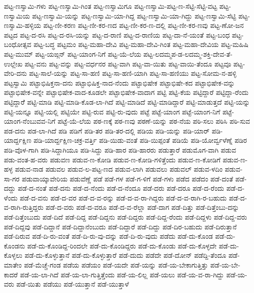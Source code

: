 ಪಟ್ಟ-ಣಸ್ವಾಮಿ-ಗಳು
ಪಟ್ಟ-ಣಸ್ವಾಮಿ-ಗಿಂತ
ಪಟ್ಟ-ಣಸ್ವಾಮಿಗೂ
ಪಟ್ಟ-ಣಸ್ವಾಮಿ-ಪಟ್ಟ-ಣ-ಸೆಟ್ಟಿ-ಸೆಟ್ಟಿ-ವಟ್ಟ
ಪಟ್ಟ-ಣಸ್ವಾಮಿಯ
ಪಟ್ಟ-ಣಸ್ವಾಮಿ-ಯನ್ನು
ಪಟ್ಟ-ಣಸ್ವಾಮಿ-ಯಾ-ಗಿದ್ದ
ಪಟ್ಟ-ಣಸ್ವಾಮಿ-ಯಾ-ಗಿದ್ದು
ಪಟ್ಟ-ಣಸ್ವಾಮಿ-ಸೆಟ್ಟಿ
ಪಟ್ಟ-ಣಸ್ವಾಮಿ-ಹಳ್ಳಿಯ
ಪಟ್ಟ-ಣೀ-ಕರಣ
ಪಟ್ಟ-ಣೀ-ಕರ-ಣದ
ಪಟ್ಟ-ಣೀ-ಕರ-ಣ-ದಲ್ಲಿ
ಪಟ್ಟ-ಣೀ-ಕರ-ಣವು
ಪಟ್ಟ-ಣೋ-ಜನ
ಪಟ್ಟದ
ಪಟ್ಟ-ದ-ರಸಿ
ಪಟ್ಟ-ದ-ರಸಿ-ಯನ್ನು
ಪಟ್ಟ-ದ-ರಾಣಿ
ಪಟ್ಟ-ದ-ರಾಣಿಯ
ಪಟ್ಟ-ದಾ-ನೆ-ಯಂತೆ
ಪಟ್ಟ-ಬಂಧ
ಪಟ್ಟ-ಬಂಧೋತ್ಸವ
ಪಟ್ಟ-ಬದ್ಧ
ಪಟ್ಟಮಂ
ಪಟ್ಟ-ಮಹಾ-ದೇವಿ
ಪಟ್ಟ-ಮಹಾ-ದೇವಿ-ಗಿಂತ
ಪಟ್ಟ-ಮಹಾ-ದೇವಿಯ
ಪಟ್ಟ-ಮಹಿಷಿ
ಪಟ್ಟ-ಮುಮ್
ಪಟ್ಟ-ಯಙ್ಗನ್
ಪಟ್ಟ-ಯಾಂಗ-ನಿಗೆ
ಪಟ್ಟ-ಯೆ-ಲೆಯ
ಪಟ್ಟ-ಲದಮ್ಮಪ-ಡ-ಲದಮ್ಮ-ಶಕ್ತಿ-ದೇವ-ತೆ-ಉಲ್ಲೇಖ
ಪಟ್ಟ-ವನು
ಪಟ್ಟ-ವನ್ನು
ಪಟ್ಟ-ವರ್ಧನರ
ಪಟ್ಟ-ವಾಗಿ
ಪಟ್ಟ-ವಾ-ಯಿತು
ಪಟ್ಟ-ವಾಯಿ-ತೆಂದೂ
ಪಟ್ಟವೂ
ಪಟ್ಟ-ವೇರಿ-ದನು
ಪಟ್ಟ-ಸಾಲೆ-ಯನ್ನು
ಪಟ್ಟ-ಸಾ-ಹಣಿ
ಪಟ್ಟ-ಸಾ-ಹಣಿ-ಯಾಗಿ
ಪಟ್ಟ-ಸಾ-ಹಣಿಯು
ಪಟ್ಟ-ಸೋಮ-ನ-ಹಳ್ಳಿ
ಪಟ್ಟಸ್ವಾಮಿ
ಪಟ್ಟಾಭಿಷಿಕ್ತನಾ-ದನು
ಪಟ್ಟಾಭಿಷಿಕ್ತ-ನಾದ-ನೆಂದು
ಪಟ್ಟಾಭಿಷೇಕ
ಪಟ್ಟಾಭಿಷೇ-ಕದ
ಪಟ್ಟಾಭಿಷೇಕ-ವನ್ನು
ಪಟ್ಟಾಭಿಷೇಕ-ವನ್ನೇ
ಪಟ್ಟಾಭಿಷೇಕ-ವಾದ-ಕೂಡಲೇ
ಪಟ್ಟಾಭಿಷೇಕ-ವಾದಾಗ
ಪಟ್ಟಿ
ಪಟ್ಟಿ-ಕೆಯ
ಪಟ್ಟಿದ್ದಾರೆ
ಪಟ್ಟಿದ್ದಾ-ರೆಂದು
ಪಟ್ಟಿದ್ದಾರೆೆ
ಪಟ್ಟಿ-ಮಾಡಿ
ಪಟ್ಟಿ-ಮಾಡಿ-ಕೊಡ-ಲಾ-ಗಿದೆ
ಪಟ್ಟಿ-ಮಾಡಿದೆ
ಪಟ್ಟಿ-ಮಾಡಿದ್ದಾರೆ
ಪಟ್ಟಿ-ಮಾಡುತ್ತದೆ
ಪಟ್ಟಿ-ಯನ್ನು
ಪಟ್ಟಿ-ಯನ್ನೂ
ಪಟ್ಟಿ-ಯಲ್ಲಿ
ಪಟ್ಟಿಯೇ
ಪಟ್ಟಿ-ರುವ
ಪಟ್ಟಿ-ರು-ವುದು
ಪಟ್ಟೆ
ಪಟ್ಟೆ-ಯಾಂಗ
ಪಟ್ಟೆ-ಯಾಂಗ-ನಿಗೆ
ಪಟ್ಟೆ-ಯಾಂಗ-ನೆಂಬುವವ-ನಿಗೆ
ಪಟ್ಟೆ-ಯೆ-ಲೆಯ
ಪಠ-ಣಕ್ಕೆ
ಪಠ-ಣವು
ಪಠಣೆ-ಯನ್ನು
ಪಠ-ನೆಯ
ಪಠಿ-ಸಲು
ಪಠಿಸಿ
ಪಠಿ-ಸುವ
ಪಡ-ದನು
ಪಡ-ಲಾ-ಗಿದೆ
ಪಡಿ
ಪಡಿಗೆ
ಪಡಿ-ತರ
ಪಡಿ-ತರ-ದಲ್ಲಿ
ಪಡಿಯ
ಪಡಿ-ಯನ್ನು
ಪಡಿ-ಯಾರ್
ಪಡಿ-ಯಾರ್ದ್ದಕ್ಷಿಣ
ಪಡಿ-ಯಾರ್ದ್ದಕ್ಷಿಣ-ಚಕ್ರ-ವರ್ತ್ತಿ
ಪಡಿ-ಯಿಡು-ವಂತೆ
ಪಡಿ-ಯಿಪ್ಪಂತೆ
ಪಡಿಯೆ
ಪಡಿ-ಯೋರ್ವ್ವಳೆಣ್ನೆ
ಪಡಿರ
ಪಡಿ-ವೊಳ-ಗಾಗಿ
ಪಡಿ-ಸಿದ್ದಾಗಿಯೂ
ಪಡಿ-ಸಿದ್ದು
ಪಡಿ-ಹಾರ
ಪಡಿ-ಹಾರರು
ಪಡುತ್ತಾರೆ
ಪಡುಮೊಗ-ವಾಗಿ
ಪಡುವ
ಪಡು-ವಂತ-ಹ-ವರು
ಪಡುವಣ
ಪಡುವ-ಣ-ಕೋಡಿ
ಪಡುವ-ಣ-ಕೋಡಿ-ಗಳಿತ್ತೆಂದು
ಪಡುವ-ಣ-ಕೋಡಿಗೆ
ಪಡುವ-ಣ-ಹಳ್ಳ
ಪಡುವ-ನಾಡ
ಪಡುವಲ
ಪಡುವ-ಲ-ಪಟ್ಟ-ಣದ
ಪಡುವ-ಲಾಗಿ
ಪಡುವಲು
ಪಡುವಲ್
ಪಡುವ-ಳದಿಂ
ಪಡುವ-ಸಾ-ಗರ
ಪಡುವಾಯ್ಕಾವೇರಿಯ
ಪಡುವೆಣ್ಣೆ
ಪಡೆ
ಪಡೆ-ಗಳ
ಪಡೆ-ಗ-ಳಿಗೆ
ಪಡೆ-ಗಳು
ಪಡೆದ
ಪಡೆದಂ
ಪಡೆ-ದಂತೆ
ಪಡೆ-ದದ್ದು
ಪಡೆ-ದ-ನಂತೆ
ಪಡೆ-ದನು
ಪಡೆ-ದ-ನೆಂದು
ಪಡೆ-ದ-ನೆಂದೂ
ಪಡೆ-ದರು
ಪಡೆ-ದರೂ
ಪಡೆ-ದ-ರೆಂದು
ಪಡೆ-ದ-ಳೆಂದು
ಪಡೆ-ದ-ವನು
ಪಡೆ-ದ-ವರ
ಪಡೆ-ದ-ವ-ರನ್ನು
ಪಡೆ-ದ-ವ-ರಾ-ಗಿದ್ದರು
ಪಡೆ-ದ-ವ-ರಾಗಿ-ರ-ಬಹುದು
ಪಡೆ-ದ-ವ-ರಾಗಿ-ರುತ್ತಿದ್ದರು
ಪಡೆ-ದ-ವರು
ಪಡೆ-ದ-ವರೂ
ಪಡೆ-ದ-ವ-ರೆಲ್ಲಾ
ಪಡೆ-ದಾಗ
ಪಡೆ-ದಿತ್ತು
ಪಡೆ-ದಿತ್ತೆಂಬು-ದನ್ನು
ಪಡೆ-ದಿತ್ತೆಂಬುದು
ಪಡೆ-ದಿದೆ
ಪಡೆ-ದಿದ್ದ
ಪಡೆ-ದಿದ್ದನು
ಪಡೆ-ದಿದ್ದರು
ಪಡೆ-ದಿದ್ದ-ರೆಂದು
ಪಡೆ-ದಿದ್ದಳು
ಪಡೆ-ದಿದ್ದ-ವರು
ಪಡೆ-ದಿದ್ದವು
ಪಡೆ-ದಿದ್ದಾನೆ
ಪಡೆ-ದಿದ್ದಾನೆಂಬುದು
ಪಡೆ-ದಿದ್ದಾರೆ
ಪಡೆ-ದಿದ್ದು
ಪಡೆ-ದಿರ-ಬಹುದು
ಪಡೆ-ದಿರುತ್ತಾನೆ
ಪಡೆ-ದಿರುವ
ಪಡೆ-ದಿ-ರು-ವಂತೆ
ಪಡೆ-ದಿ-ರು-ವು-ದನ್ನು
ಪಡೆ-ದಿ-ರು-ವುದು
ಪಡೆದು
ಪಡೆ-ದು-ಕೊಂಡ
ಪಡೆ-ದು-ಕೊಂಡನು
ಪಡೆ-ದು-ಕೊಂಡಿದ್ದ-ರಿಂದಲೇ
ಪಡೆ-ದು-ಕೊಂಡಿದ್ದರು
ಪಡೆ-ದು-ಕೊಂಡು
ಪಡೆ-ದು-ಕೊಳ್ಳದೇ
ಪಡೆ-ದು-ಕೊಳ್ಳಲು
ಪಡೆ-ದು-ಕೊಳ್ಳುತ್ತಾನೆ
ಪಡೆ-ದು-ಕೊಳ್ಳುತ್ತಾರೆ
ಪಡೆ-ದುದು
ಪಡೆದೇ
ಪಡೆ-ದೋನ್
ಪಡೆದ್ದಿ-ತೆಂದೂ
ಪಡೆ-ಮಾತೇಂ
ಪಡೆ-ಮೆಚ್ಚೆ-ಗಂಡ
ಪಡೆಯ
ಪಡೆಯಂ
ಪಡೆ-ಯದೇ
ಪಡೆ-ಯನ್ನು
ಪಡೆ-ಯ-ಬೇಕಾಗುತ್ತಿತ್ತು
ಪಡೆ-ಯ-ಬೇ-ಕಾದರೆ
ಪಡೆ-ಯ-ಲಾ-ಗಿದೆ
ಪಡೆ-ಯ-ಲಾ-ಗುತ್ತಿತ್ತೆಂದು
ಪಡೆ-ಯ-ಲಿಲ್ಲ
ಪಡೆ-ಯಲು
ಪಡೆ-ಯ-ವ-ರಾ-ಗಿದ್ದು
ಪಡೆ-ಯ-ವರು
ಪಡೆ-ಯಿತು
ಪಡೆಯು
ಪಡೆ-ಯುತ್ತಾನೆ
ಪಡೆ-ಯುತ್ತಾಳೆ
